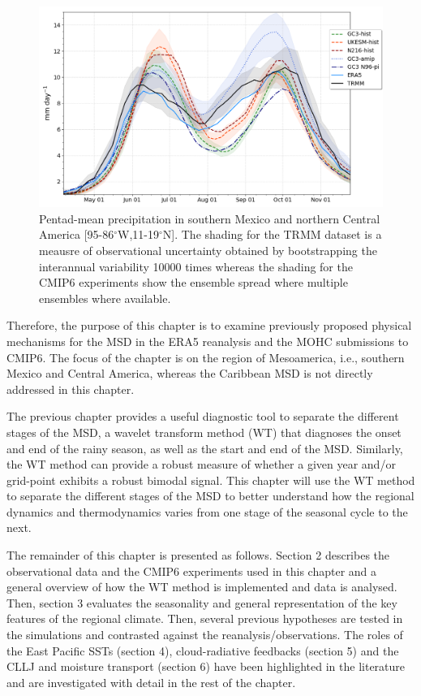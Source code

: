  \begin{figure}[t!]
\includegraphics[width=\linewidth]{figures/seasonal_cycle_p3.png}
\caption[Seasonal cycle of precipitation in Mesoamerica]{Pentad-mean precipitation in southern Mexico and northern Central America [95-86$^\circ$W,11-19$^\circ$N]. The shading for the TRMM dataset is a meausre of observational uncertainty obtained by bootstrapping the interannual variability 10000 times whereas the shading for the CMIP6 experiments show the ensemble spread where multiple ensembles where available. }
\label{fig:msdcaribb}
\end{figure} 
 
  Therefore, the purpose of this chapter is to examine previously proposed physical mechanisms for the MSD in the ERA5 reanalysis and the MOHC submissions to CMIP6. The focus of the chapter is on the region of Mesoamerica, i.e., southern Mexico and Central America, whereas the Caribbean MSD is not directly addressed in this chapter.

The previous chapter provides a useful diagnostic tool to separate the different stages of the MSD, a wavelet transform method (WT) that diagnoses the onset and end of the rainy season, as well as the start and end of the MSD. Similarly, the WT method can provide a robust measure of whether a given year and/or grid-point exhibits a robust bimodal signal. This chapter will use the WT method to separate the different stages of the MSD to better understand how the regional dynamics and thermodynamics varies from one stage of the seasonal cycle to the next. 

The remainder of this chapter is presented as follows. Section 2 describes the observational data and the CMIP6 experiments used in this chapter and a general overview of how the WT method is implemented and data is analysed. Then, section 3 evaluates the seasonality and general representation of the key features of the regional climate.
Then, several previous hypotheses are tested in the simulations and contrasted against the reanalysis/observations. 
The roles of the East Pacific SSTs (section 4), cloud-radiative feedbacks (section 5) and the CLLJ and moisture transport (section 6) have been highlighted in the literature and are investigated with detail in the rest of the chapter.
  
